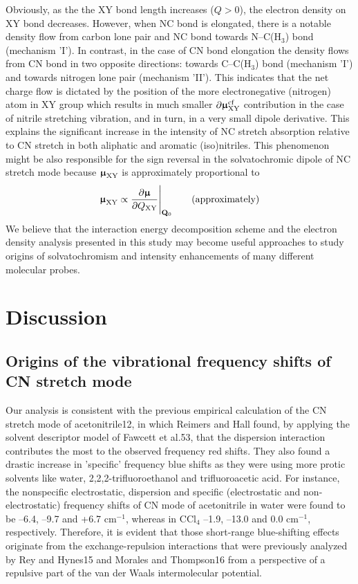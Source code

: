 \documentclass[a4paper,titlepage,twoside,fleqn,12pt]{book}
\newcommand{\BM}[1]{\bm{#1}}
\newcommand{\fderiv}[2]{\ensuremath{
\frac{\partial #1}{\partial #2}}}
\begin{document}
\begin{refsection}
Obviously, as the
the XY bond length increases ($Q>0$), the electron density on XY bond decreases. However, 
when NC bond is elongated, there is a notable density flow from carbon lone pair and NC 
bond towards N--C(H$_3$) bond (mechanism 'I'). In contrast, in the case of CN bond elongation 
the density flows from CN bond in two opposite directions: towards C--C(H$_3$) bond 
(mechanism 'I') and towards nitrogen lone pair (mechanism 'II'). This indicates that the net 
charge flow is dictated by the position of the more electronegative (nitrogen) atom in XY group 
which results in much smaller $\partial {\BM \upmu}_{\rm XY}^{\rm cf}$ contribution in the case of
nitrile stretching vibration,
and in turn, in a very small dipole derivative. This explains the significant increase in the 
intensity of NC stretch absorption relative to CN stretch in both aliphatic and aromatic 
(iso)nitriles. This phenomenon might be also responsible for the sign reversal in the
solvatochromic dipole of NC stretch mode because ${\BM \upmu}_{\rm XY}$ is approximately proportional to
%
\begin{equation}
 {\BM \upmu}_{\rm XY} \propto \fderiv{{\BM \upmu}}{Q_{\rm XY}} \Bigg|_{{\bf Q}_{0}} 
    \qquad\text{(approximately)}
\end{equation}
%
We believe that the interaction energy decomposition scheme and the electron density
analysis presented in this study may become useful approaches to study origins of 
solvatochromism and intensity enhancements of many different molecular probes.


\section{Discussion}

\subsection{Origins of the vibrational frequency shifts of CN stretch mode}

Our analysis is consistent with the previous empirical
calculation of the CN stretch mode of acetonitrile12, in which
Reimers and Hall found, by applying the solvent descriptor
model of Fawcett et al.53, that the dispersion interaction
contributes the most to the observed frequency red shifts.
They also found a drastic increase in 'specific' frequency blue
shifts as they were using more protic solvents like water, 
2,2,2\hyp{}trifluoroethanol and trifluoroacetic acid. For instance, the nonspecific
electrostatic, dispersion and specific (electrostatic and
non-electrostatic) frequency shifts of CN mode of acetonitrile
in water were found to be --6.4, --9.7 and +6.7 cm$^{-1}$, whereas in
CCl$_4$ --1.9, --13.0 and 0.0 cm$^{-1}$, respectively. Therefore, it is
evident that those short\hyp{}range blue\hyp{}shifting effects originate
from the exchange\hyp{}repulsion interactions that were previously
analyzed by Rey and Hynes15 and Morales and Thompson16
from a perspective of a repulsive part of the van der Waals
intermolecular potential.


\end{refsection}
\end{document}
